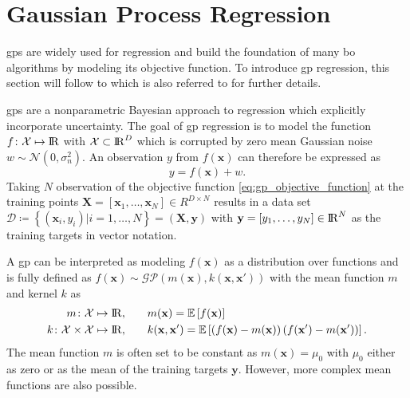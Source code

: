 \section{Gaussian Process Regression}
\label{sec:gaussian_process}

\glspl{gp} are widely used for regression and build the foundation of many \gls{bo} algorithms by modeling its objective function. To introduce \gls{gp} regression, this section will follow \textcite{Rasmussen_2006} to which is also referred to for further details.

\glspl{gp} are a nonparametric Bayesian approach to regression which explicitly incorporate uncertainty. The goal of \gls{gp} regression is to model the function $f \colon \mathcal{X} \mapsto \mathrm{I\!R}$ with $\mathcal{X} \subset \mathrm{I\!R}^D$ which is corrupted by zero mean Gaussian noise $w \sim \mathcal{N}\left( 0, \sigma_n^2 \right)$. An observation $y$ from $f(\mathbf{x})$ can therefore be expressed as
\begin{equation}
    y = f(\mathbf{x}) + w.
    \label{eq:gp_objective_function}
\end{equation}
Taking $N$ observation of the objective function \eqref{eq:gp_objective_function} at the training points $\mathbf{X} = [\mathbf{x}_1, \dots, \mathbf{x}_N] \in R^{D \times N}$ results in a data set $\mathcal{D} \coloneqq \left\{ (\mathbf{x}_i, y_i)|i = 1,\dots, N \right\} = (\mathbf{X}, \mathbf{y})$ with $\mathbf{y} = [y_1,\dots,y_N] \in \mathrm{I\!R}^N$ as the training targets in vector notation. 

A \gls{gp} can be interpreted as modeling $f(\mathbf{x})$ as a distribution over functions and is fully defined as $f(\mathbf{x}) \sim \mathcal{GP}\left(m(\mathbf{x}), k(\mathbf{x}, \mathbf{x}') \right)$
with the mean function $m$ and kernel $k$ as
\begin{alignat}{2}
    m \colon \mathcal{X} &\mapsto \mathrm{I\!R}, \quad &&m(\mathbf{x}) = \operatorname{\mathbb{E}}\left[ f(\mathbf{x}) \right] \\
    k \colon \mathcal{X} \times \mathcal{X} &\mapsto \mathrm{I\!R}, \quad &&k(\mathbf{x}, \mathbf{x}') = \operatorname{\mathbb{E}}\left[ \left( f(\mathbf{x})- m(\mathbf{x})\right) \left(f(\mathbf{x}')- m(\mathbf{x}')\right) \right].
\end{alignat}
The mean function $m$ is often set to be constant as $m(\mathbf{x}) = \mu_0$ with $\mu_0$ either as zero or as the mean of the training targets $\mathbf{y}$. However, more complex mean functions are also possible.

